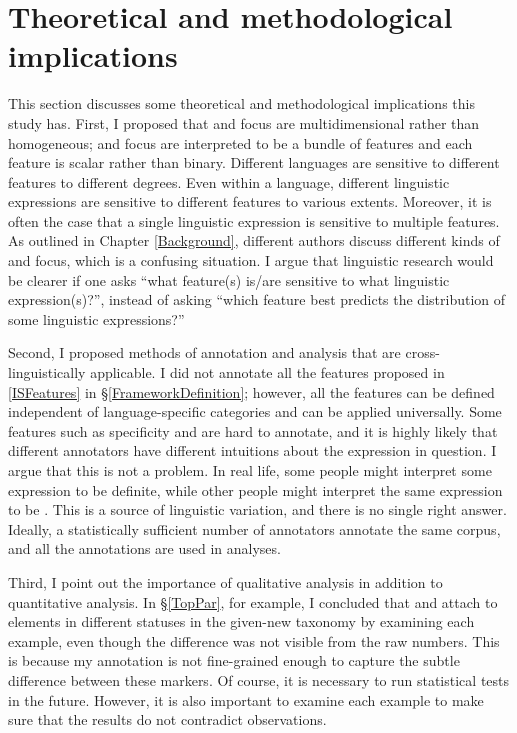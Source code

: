 \section{Theoretical and methodological implications}

This section discusses some theoretical and methodological implications
this study has.
First, I proposed that  and focus are multidimensional
rather than homogeneous;
 and focus are interpreted to be a bundle of features and
each feature is scalar rather than binary.
Different languages are sensitive to different features to different degrees.
Even within a language,
different linguistic expressions are sensitive to different features to various extents.
Moreover, it is often the case that
a single linguistic expression is sensitive to multiple features.
As outlined in Chapter \ref{Background},
different authors discuss different kinds of  and focus,
which is a confusing situation.
I argue that linguistic research would be clearer if one asks
``what feature(s) is/are sensitive to what linguistic expression(s)?'',
instead of asking
``which feature best predicts the distribution of some linguistic expressions?''

Second,
I proposed methods of annotation and analysis
that are cross-linguistically applicable.
I did not annotate all the features proposed in \ref{ISFeatures} in \S \ref{FrameworkDefinition};
however, all the features can be defined independent of language-specific categories and can be applied universally.
Some features such as specificity and  are hard to annotate, and it is highly likely that different annotators have different intuitions about the expression in question.
I argue that this is not a problem.
In real life,
some people might interpret some expression to be definite,
while other people might interpret the same expression to be .
This is a source of linguistic variation, and there is no single right answer.
Ideally, a statistically sufficient number of annotators annotate the same corpus, and all the annotations are used in analyses.

Third,
I point out the importance of qualitative analysis in addition to quantitative analysis.
In \S \ref{TopPar}, for example,
I concluded that  and  attach to elements in different statuses in the given-new taxonomy by examining each example,
even though the difference was not visible from the raw numbers.
This is because my annotation is not fine-grained enough to capture the subtle difference between these markers.
Of course, it is necessary to run statistical tests in the future.
However, it is also important to examine each example to make sure that
the results do not contradict observations.



